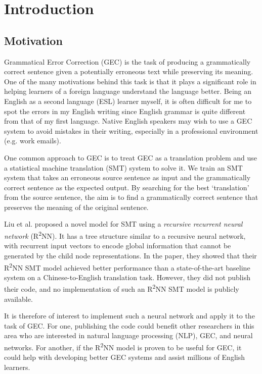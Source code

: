 \documentclass[12pt,a4paper,twoside,openright]{report}
\begin{document}
\tableofcontents

\listoffigures

\pagestyle{headings}

\chapter{Introduction}

\section{Motivation}

Grammatical Error Correction (GEC) is the task of producing a grammatically correct sentence given a potentially erroneous text while preserving its meaning. One of the many motivations behind this task is that it plays a significant role in helping learners of a foreign language understand the language better. Being an English as a second language (ESL) learner myself, it is often difficult for me to spot the errors in my English writing since English grammar is quite different from that of my first language. Native English speakers may wish to use a GEC system to avoid mistakes in their writing, especially in a professional environment (e.g. work emails). 

One common approach to GEC is to treat GEC as a translation problem and use a statistical machine translation (SMT) system to solve it. We train an SMT system that takes an erroneous source sentence as input and the grammatically correct sentence as the expected output. By searching for the best `translation' from the source sentence, the aim is to find a grammatically correct sentence that preserves the meaning of the original sentence.

Liu et al. proposed a novel model for SMT using a \textit{recursive recurrent neural network} (R\textsuperscript{2}NN)\cite{r2nn}. It has a tree structure similar to a recursive neural network, with recurrent input vectors to encode global information that cannot be generated by the child node representations. In the paper, they showed that their R\textsuperscript{2}NN SMT model achieved better performance than a state-of-the-art baseline system on a Chinese-to-English translation task. However, they did not publish their code, and no implementation of such an R\textsuperscript{2}NN SMT model is publicly available.

It is therefore of interest to implement such a neural network and apply it to the task of GEC. For one, publishing the code could benefit other researchers in this area who are interested in natural language processing (NLP), GEC, and neural networks. For another, if the R\textsuperscript{2}NN model is proven to be useful for GEC, it could help with developing better GEC systems and assist millions of English learners.
\end{document}
